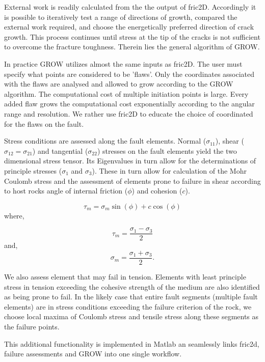 \documentclass[12pt,a4paper]{article}
\begin{document}
External work is readily calculated from the the output of fric2D. Accordingly it is possible to iteratively test a range of directions of growth, compared the external work required, and choose the energetically preferred direction of crack growth. This process continues until stress at the tip of the cracks is not sufficient to overcome the fracture toughness. Therein lies the general algorithm of GROW. 

In practice GROW utilizes almost the same inputs as fric2D. The user must specify what points are considered to be 'flaws'. Only the coordinates associated with the flaws are analysed and allowed to grow according to the GROW algorithm. The computational cost of multiple initiation points is large. Every added flaw grows the computational cost exponentially according to the angular range and resolution. We rather use fric2D to educate the choice of coordinated for the flaws on the fault. 

Stress conditions are assessed along the fault elements. Normal ($\sigma_{11}$), shear ($\sigma_{12} = \sigma_{21}$) and tangential ($\sigma_22$) stresses on the fault elements yield the two dimensional stress tensor. Its Eigenvalues in turn allow for the determinations of principle stresses ($\sigma_1$ and $\sigma_3$). These in turn allow for calculation of the Mohr Coulomb stress and the assessment of elements prone to failure in shear according to host rocks angle of internal friction ($\phi$) and cohesion ($c$).

\begin{equation}
\tau_m = \sigma_m \sin(\phi) + c \cos(\phi)
\end{equation}
%
where,

\begin{equation}
\tau_m = \dfrac{\sigma_1-\sigma_3}{2}
\end{equation}
%
and,
\begin{equation}
\sigma_m = \dfrac{\sigma_1+\sigma_3}{2}.
\end{equation}

We also assess element that may fail in tension. Elements with least principle stress in tension exceeding the cohesive strength of the medium are also identified as being prone to fail. In the likely case that entire fault segments (multiple fault elements) are in stress conditions exceeding the failure criterion of the rock, we choose local maxima of Coulomb stress and tensile stress along these segments as the failure points.

This additional functionality is implemented in Matlab an seamlessly links fric2d, failure assessments and GROW into one single workflow.
\end{document}
